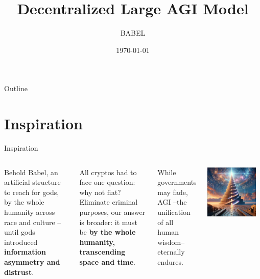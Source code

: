 \documentclass{beamer}
\title{Decentralized Large AGI Model}
\author{BABEL}
\institute{P.I.V.O.T. DAO}
\date{\today}
\begin{document}
\begin{frame}
\titlepage
\end{frame}

\begin{frame}{Outline}
\tableofcontents
\end{frame}

\section{Inspiration}
\begin{frame}{Inspiration}

\begin{columns}
Behold Babel, an artificial structure to reach for gods,  by the whole humanity across race and culture -- until gods introduced \textbf{information asymmetry and distrust}. 

All cryptos had to face one question: why not fiat? Eliminate criminal purposes, our answer is broader: it must be \textbf{by the whole humanity, transcending space and time}. 

While governments may fade, AGI --the unification of all human wisdom-- eternally endures.
\begin{center}
\includegraphics[width=0.9\textwidth]{images/babel.png}
\end{center}
\end{columns}

\end{frame}
\end{document}
